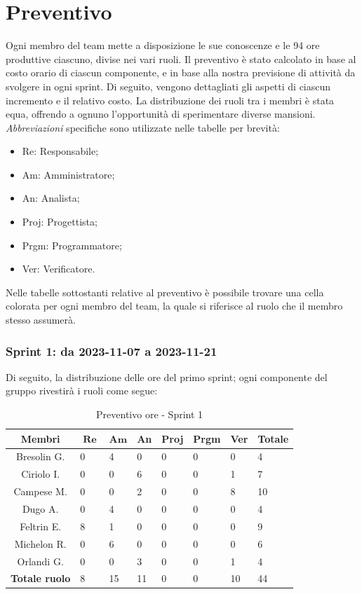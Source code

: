 \documentclass[10pt, a4paper]{article}
\begin{document}
\section{Preventivo}
Ogni membro del team mette a disposizione le sue conoscenze e le 94 ore produttive ciascuno, divise nei vari ruoli. Il preventivo è stato calcolato in base al costo orario di ciascun componente, e in base alla nostra previsione di attività da svolgere in ogni sprint. Di seguito, vengono dettagliati gli aspetti di ciascun incremento e il relativo costo. La distribuzione dei ruoli tra i membri è stata equa, offrendo a ognuno l'opportunità di sperimentare diverse mansioni. \textit{Abbreviazioni\pg} specifiche sono utilizzate nelle tabelle per brevità:
\begin{itemize}
    \item Re: Responsabile;
    \item Am: Amministratore;
    \item An: Analista;
    \item Proj: Progettista;
    \item Prgm: Programmatore;
    \item Ver: Verificatore.
\end{itemize}
Nelle tabelle sottostanti relative al preventivo è possibile trovare una cella colorata per ogni membro del team, la quale si riferisce al ruolo che il membro stesso assumerà.
\subsubsection{Sprint 1: da 2023-11-07 a 2023-11-21}

Di seguito, la distribuzione delle ore del primo sprint; ogni componente del gruppo rivestirà i ruoli come segue:
\begin{table}[H]
\begin{tabularx}{\textwidth}{c|X|X|X|X|X|X|X}
        \textbf{Membri} & $\operatorname{\textbf{Re}}$ & $\mathrm{\textbf{Am}}$ & \textbf{An} & \textbf{Proj} & \textbf{Prgm} & \textbf{Ver} & \textbf{Totale} \\
        \hline Bresolin G. & 0 & \cellcolor{primarycolor}4 & 0 & 0 & 0 & 0 & 4 \\
        \hline Ciriolo I.  & 0 & 0 & \cellcolor{primarycolor}6 & 0 & 0 & 1 & 7 \\
        \hline Campese M.  & 0 & 0 & 2 & 0 & 0 & \cellcolor{primarycolor}8 & 10 \\
        \hline Dugo A.     & 0 & \cellcolor{primarycolor}4 & 0 & 0 & 0 & 0 & 4 \\
        \hline Feltrin E.  & \cellcolor{primarycolor}8 & 1 & 0 & 0 & 0 & 0 & 9 \\
        \hline Michelon R. & 0 & \cellcolor{primarycolor}6 & 0 & 0 & 0 & 0 & 6 \\
        \hline Orlandi G.  & 0 & 0 & \cellcolor{primarycolor}3 & 0 & 0 & 1 & 4 \\
        \hline
        \textbf{Totale ruolo} & 8 & 15 & 11 & 0 & 0 & 10 & 44 
    \end{tabularx}
    \caption{Preventivo ore - Sprint 1}
    \end{table}
\end{document}
